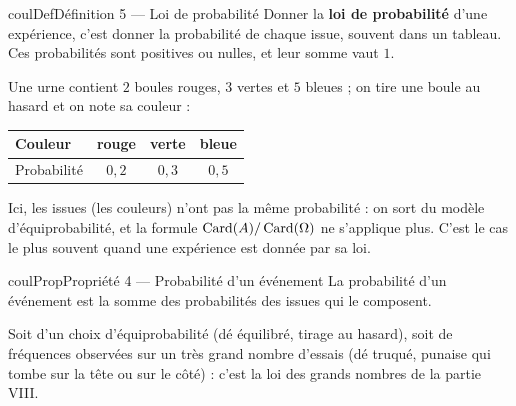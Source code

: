 \documentclass[11pt,a4paper]{article}
\makeatletter
\newcounter{lycee@signet}
\newcommand{\signet}[3][]{\stepcounter{lycee@signet}%
  \edef\lycee@dest{\if\relax\detokenize{#1}\relax
    signet.\arabic{lycee@signet}\else#1\fi}%
  \hypertarget{\lycee@dest}{}\bookmark[level=#2,dest=\lycee@dest]{#3}}
\newenvironment{definitionbox}[1][Définition]%
  {\begin{boitecours}[phantom={\signet{2}{#1}}]{coulDef}{#1}}{\end{boitecours}}
\newenvironment{proprietebox}[1][Propriété]%
  {\begin{boitecours}[phantom={\signet{2}{#1}}]{coulProp}{#1}}{\end{boitecours}}
\makeatother
\begin{document}
\begin{definitionbox}[Définition 5 --- Loi de probabilité]
Donner la \textbf{loi de probabilité} d'une expérience, c'est donner la probabilité de
chaque issue, souvent dans un tableau. Ces probabilités sont positives ou nulles, et
leur somme vaut $1$.

\smallskip
Une urne contient $2$ boules rouges, $3$ vertes et $5$ bleues ; on tire une boule au
hasard et on note sa couleur :
\begin{center}
\renewcommand{\arraystretch}{1.5}
\begin{tabular}{|l|c|c|c|}
\hline
Couleur & rouge & verte & bleue \\
\hline
Probabilité & $0{,}2$ & $0{,}3$ & $0{,}5$ \\
\hline
\end{tabular}
\end{center}
Ici, les issues (les couleurs) n'ont pas la même probabilité : on sort du modèle
d'équiprobabilité, et la formule $\operatorname{Card}(A)/\operatorname{Card}(\Omega)$ ne s'applique plus.
C'est le cas le plus souvent quand une expérience est donnée par sa loi.
\end{definitionbox}

\begin{proprietebox}[Propriété 4 --- Probabilité d'un événement]
La probabilité d'un événement est la somme des probabilités des issues qui le
composent.
\end{proprietebox}

\begin{remarquebox}
Soit d'un choix d'équiprobabilité (dé équilibré, tirage au hasard), soit de fréquences
observées sur un très grand nombre d'essais (dé truqué, punaise qui tombe sur la tête
ou sur le côté) : c'est la loi des grands nombres de la partie VIII.
\end{remarquebox}
\end{document}
